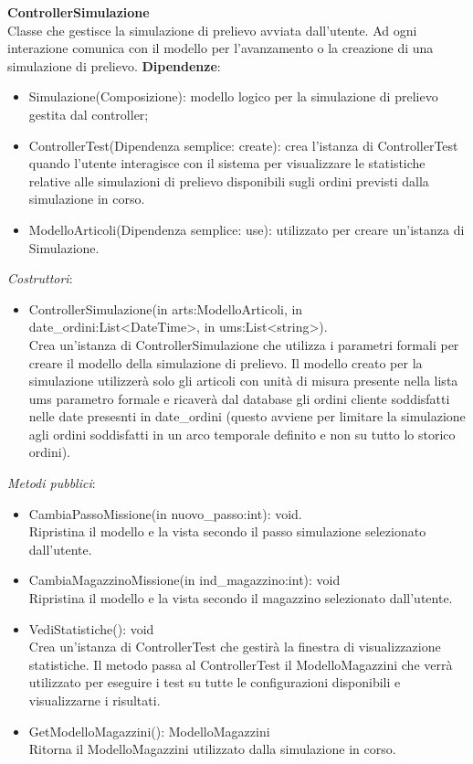 \textbf{ControllerSimulazione}\\
Classe che gestisce la simulazione di prelievo avviata dall'utente. Ad ogni interazione comunica con il modello per l'avanzamento o la creazione di una simulazione di prelievo.
\textbf{Dipendenze}:
\begin{itemize}
    \item Simulazione(Composizione): modello logico per la simulazione di prelievo gestita dal controller;\\
    \item ControllerTest(Dipendenza semplice: create): crea l'istanza di ControllerTest quando l'utente interagisce con il sistema per visualizzare le statistiche relative 
    alle simulazioni di prelievo disponibili sugli ordini previsti dalla simulazione in corso.
    \item ModelloArticoli(Dipendenza semplice: use): utilizzato per creare un'istanza di Simulazione.
\end{itemize}
\textit{Costruttori}:\\
\begin{itemize}
    \item ControllerSimulazione(in arts:ModelloArticoli, in date\_ordini:List<DateTime>, in ums:List<string>).\\
    Crea un'istanza di ControllerSimulazione che utilizza i parametri formali per creare il modello della simulazione di prelievo.
    Il modello creato per la simulazione utilizzerà solo gli articoli con unità di misura presente nella lista ums parametro formale e ricaverà dal database gli ordini cliente 
    soddisfatti nelle date presesnti in date\_ordini (questo avviene per limitare la simulazione agli ordini soddisfatti in un arco temporale definito e non su tutto lo storico ordini).
\end{itemize}
\textit{Metodi pubblici}:\\
\begin{itemize}
    \item CambiaPassoMissione(in nuovo\_passo:int): void.\\
    Ripristina il modello e la vista secondo il passo simulazione selezionato dall'utente.
    \item CambiaMagazzinoMissione(in ind\_magazzino:int): void \\
    Ripristina il modello e la vista secondo il magazzino selezionato dall'utente.
    \item VediStatistiche(): void \\
    Crea un'istanza di ControllerTest che gestirà la finestra di visualizzazione statistiche.
    Il metodo passa al ControllerTest il ModelloMagazzini che verrà utilizzato per eseguire i test su tutte le configurazioni disponibili e visualizzarne i risultati.
    \item GetModelloMagazzini(): ModelloMagazzini \\
    Ritorna il ModelloMagazzini utilizzato dalla simulazione in corso.
\end{itemize} 
